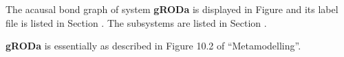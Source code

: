 
%

   The acausal bond graph of system \textbf{gRODa} is
   displayed in Figure  and its label
   file is listed in Section .
   The subsystems are listed in Section .

{\bf gRODa} is essentially as described in Figure 10.2 of
``Metamodelling''.
